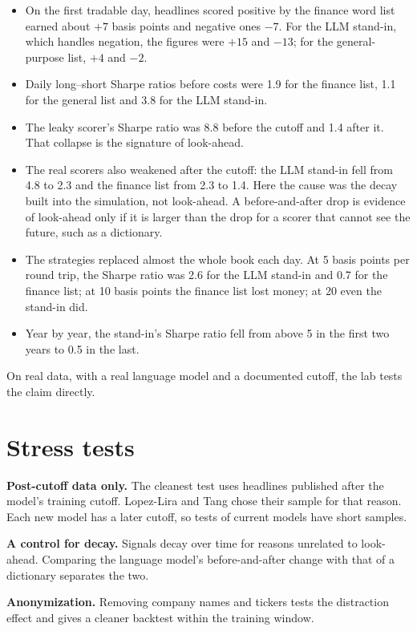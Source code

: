 \begin{itemize}
  \item On the first tradable day, headlines scored positive by the finance word list earned about $+7$ basis points and negative ones $-7$. For the LLM stand-in, which handles negation, the figures were $+15$ and $-13$; for the general-purpose list, $+4$ and $-2$.
  \item Daily long--short Sharpe ratios before costs were 1.9 for the finance list, 1.1 for the general list and 3.8 for the LLM stand-in.
  \item The leaky scorer's Sharpe ratio was 8.8 before the cutoff and 1.4 after it. That collapse is the signature of look-ahead.
  \item The real scorers also weakened after the cutoff: the LLM stand-in fell from 4.8 to 2.3 and the finance list from 2.3 to 1.4. Here the cause was the decay built into the simulation, not look-ahead. A before-and-after drop is evidence of look-ahead only if it is larger than the drop for a scorer that cannot see the future, such as a dictionary.
  \item The strategies replaced almost the whole book each day. At 5 basis points per round trip, the Sharpe ratio was 2.6 for the LLM stand-in and 0.7 for the finance list; at 10 basis points the finance list lost money; at 20 even the stand-in did.
  \item Year by year, the stand-in's Sharpe ratio fell from above 5 in the first two years to 0.5 in the last.
\end{itemize}

On real data, with a real language model and a documented cutoff, the lab tests the claim directly.

\section{Stress tests}
\label{sec:23-stress}

\textbf{Post-cutoff data only.} The cleanest test uses headlines published after the model's training cutoff. Lopez-Lira and Tang chose their sample for that reason. Each new model has a later cutoff, so tests of current models have short samples.

\textbf{A control for decay.} Signals decay over time for reasons unrelated to look-ahead. Comparing the language model's before-and-after change with that of a dictionary separates the two.

\textbf{Anonymization.} Removing company names and tickers tests the distraction effect and gives a cleaner backtest within the training window.

